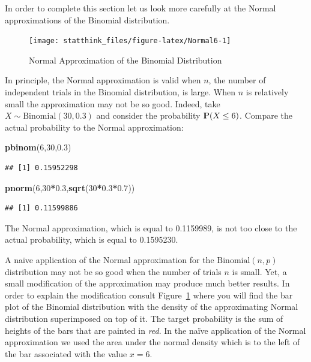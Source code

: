 \documentclass[]{krantz}
\makeatletter
\newenvironment{Shaded}{\begin{snugshade}}{\end{snugshade}}
\newcommand{\KeywordTok}[1]{\textcolor[rgb]{0.13,0.29,0.53}{\textbf{#1}}}
\newcommand{\DecValTok}[1]{\textcolor[rgb]{0.00,0.00,0.81}{#1}}
\newcommand{\FloatTok}[1]{\textcolor[rgb]{0.00,0.00,0.81}{#1}}
\newcommand{\OperatorTok}[1]{\textcolor[rgb]{0.81,0.36,0.00}{\textbf{#1}}}
\newcommand{\NormalTok}[1]{#1}
\newcommand{\Prob}{{\rm I\kern-.3em P}}
\newenvironment{kframe}{%
\medskip{}
\setlength{\fboxsep}{.8em}
 \def\at@end@of@kframe{}%
 \ifinner\ifhmode%
  \def\at@end@of@kframe{\end{minipage}}%
  \begin{minipage}{\columnwidth}%
 \fi\fi%
 \def\FrameCommand##1{\hskip\@totalleftmargin \hskip-\fboxsep
 \colorbox{shadecolor}{##1}\hskip-\fboxsep
     \hskip-\linewidth \hskip-\@totalleftmargin \hskip\columnwidth}%
 \MakeFramed {\advance\hsize-\width
   \@totalleftmargin\z@ \linewidth\hsize
   \@setminipage}}%
 {\par\unskip\endMakeFramed%
 \at@end@of@kframe}
\renewenvironment{Shaded}{\begin{kframe}}{\end{kframe}}
\theoremstyle{definition}
\theoremstyle{definition}
\theoremstyle{definition}
\theoremstyle{remark}
\makeatother
\begin{document}
In order to complete this section let us look more carefully at the
Normal approximations of the Binomial distribution.

\begin{figure}

{\centering \texttt{[image: statthink\_files/figure-latex/Normal6-1]} 

}

\caption{Normal Approximation of the Binomial Distribution}\label{fig:Normal6}
\end{figure}

In principle, the Normal approximation is valid when \(n\), the number
of independent trials in the Binomial distribution, is large. When \(n\)
is relatively small the approximation may not be so good. Indeed, take
\(X \sim \mathrm{Binomial}(30,0.3)\) and consider the probability
\(\Prob(X \leq 6)\). Compare the actual probability to the Normal
approximation:

\begin{Shaded}
\begin{Highlighting}[]
\KeywordTok{pbinom}\NormalTok{(}\DecValTok{6}\NormalTok{,}\DecValTok{30}\NormalTok{,}\FloatTok{0.3}\NormalTok{)}
\end{Highlighting}
\end{Shaded}

\begin{verbatim}
## [1] 0.15952298
\end{verbatim}

\begin{Shaded}
\begin{Highlighting}[]
\KeywordTok{pnorm}\NormalTok{(}\DecValTok{6}\NormalTok{,}\DecValTok{30}\OperatorTok{*}\FloatTok{0.3}\NormalTok{,}\KeywordTok{sqrt}\NormalTok{(}\DecValTok{30}\OperatorTok{*}\FloatTok{0.3}\OperatorTok{*}\FloatTok{0.7}\NormalTok{))}
\end{Highlighting}
\end{Shaded}

\begin{verbatim}
## [1] 0.11599886
\end{verbatim}

The Normal approximation, which is equal to 0.1159989, is not too close
to the actual probability, which is equal to 0.1595230.

A naïve application of the Normal approximation for the
\(\mathrm{Binomial}(n,p)\) distribution may not be so good when the
number of trials \(n\) is small. Yet, a small modification of the
approximation may produce much better results. In order to explain the
modification consult Figure~\ref{fig:Normal6} where you will find the
bar plot of the Binomial distribution with the density of the
approximating Normal distribution superimposed on top of it. The target
probability is the sum of heights of the bars that are painted in
\emph{red}. In the naïve application of the Normal approximation we used
the area under the normal density which is to the left of the bar
associated with the value \(x=6\).
\end{document}
